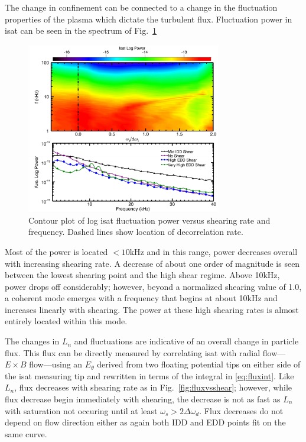 \documentclass[%
 aps,
 prl,
 amsmath,amssymb,
 reprint,%
]{revtex4-1}
\begin{document}
The change in confinement can be connected to a change in the fluctuation properties of the plasma which dictate the turbulent flux. Fluctuation power in isat can be seen in the spectrum of Fig.~\ref{fig:powercontour}
\begin{figure}
\begin{center}
\includegraphics[width=8.5cm]{powercontour.pdf}%
\caption{\label{fig:powercontour} Contour plot of log isat fluctuation power versus shearing rate and frequency. Dashed lines show location of decorrelation rate.}
\end{center}
\end{figure}
Most of the power is located $<10$kHz and in this range, power decreases overall with increasing shearing rate. A decrease of about one order of magnitude is seen between the lowest shearing point and the high shear regime. Above 10kHz, power drops off considerably; however, beyond a normalized shearing value of 1.0, a coherent mode emerges with a frequency that begins at about 10kHz and increases linearly with shearing. The power at these high shearing rates is almost entirely located within this mode.

The changes in $L_{n}$ and fluctuations are indicative of an overall change in particle flux. This flux can be directly measured by correlating isat with radial flow---$E \times B$ flow---using an $E_{\theta}$ derived from two floating potential tips on either side of the isat measuring tip and rewritten in terms of the integral in \eqref{eq:fluxint}. Like $L_{n}$, flux decreases with shearing rate as in Fig.~\ref{fig:fluxvsshear}; however, while flux decrease begin immediately with shearing, the decrease is not as fast as $L_{n}$ with saturation not occuring until at least $\omega_{s} > 2\Delta \omega_{d}$. Flux decreases do not depend on flow direction either as again both IDD and EDD points fit on the same curve.
\end{document}
